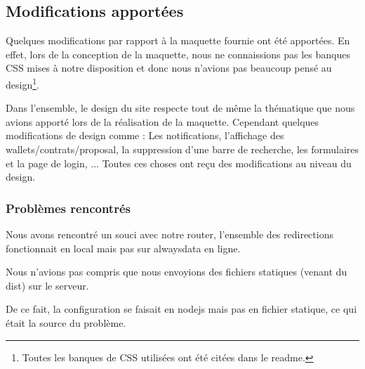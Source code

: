 \newpage
\subsection{Modifications apportées}
\begin{flushleft}
    Quelques modifications par rapport à la maquette fournie ont été apportées. En effet, lors de la conception de la maquette, nous ne connaissions pas les banques CSS mises à notre disposition et donc nous n'avions pas beaucoup pensé au design\footnote{Toutes les banques de CSS utilisées ont été citées dans le readme.}.
\end{flushleft}
\begin{flushleft}
    Dans l'ensemble, le design du site respecte tout de même la thématique que nous avions apporté lors de la réalisation de la maquette. Cependant quelques modifications de design comme : Les notifications, l'affichage des wallets/contrats/proposal, la suppression d'une barre de recherche, les formulaires et la page de login, ... Toutes ces choses ont reçu des modifications au niveau du design.
\end{flushleft} 

\subsubsection{Problèmes rencontrés}
\begin{flushleft}
Nous avons rencontré un souci avec notre router, l’ensemble des redirections fonctionnait en local mais pas sur alwaysdata en ligne.
\end{flushleft}
\begin{flushleft}
Nous n’avions pas compris que nous envoyions des fichiers statiques (venant du dist) sur le serveur.
\end{flushleft}
\begin{flushleft}
De ce fait, la configuration se faisait en nodejs mais pas en fichier statique, ce qui était la source du problème.
\end{flushleft}

\newpage
